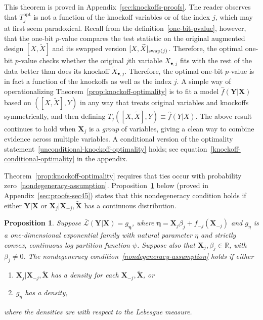 \documentclass[ejs]{imsart}
\numberwithin{equation}{section}
\theoremstyle{plain}
\newtheorem{proposition}{Proposition}
\theoremstyle{definition}
\theoremstyle{remark}
\newcommand{\prx}{\bm X}
\newcommand{\srx}{X}
\newcommand{\prxk}{{{\widetilde{\bm X}}}}
\newcommand{\srxk}{\widetilde X}
\newcommand{\pry}{{\bm Y}}
\newcommand{\sry}{Y}
\begin{document}
This theorem is proved in Appendix~\ref{sec:knockoffs-proofs}. The reader observes that $T_j^{\text{opt}}$ is not a function of the knockoff variables or of the index $j$, which may at first seem paradoxical. Recall from the definition~\eqref{one-bit-pvalue}, however, that the one-bit $p$-value compares the test statistic on the original augmented design $[\srx, \srxk]$ and its swapped version $[\srx, \srxk]_{\textnormal{swap}(j)}$. Therefore, the optimal one-bit $p$-value checks whether the original $j$th variable $\srx_{\bullet, j}$ fits with the rest of the data better than does its knockoff $\srxk_{\bullet, j}$. Therefore, the optimal one-bit $p$-value is in fact a function of the knockoffs as well as the index $j$. A simple way of operationalizing Theorem~\ref{prop:knockoff-optimality} is to fit a model $\widehat f(\pry|\prx)$ based on $([\srx, \srxk], \sry)$ in any way that treats original variables and knockoffs symmetrically, and then defining $T_j([\srx, \srxk], \sry) \equiv \widehat f(\sry|\srx)$. The above result continues to hold when $\prx_j$ is a \textit{group} of variables, giving a clean way to combine evidence across multiple variables. A conditional version of the optimality statement~\eqref{unconditional-knockoff-optimality} holds; see equation~\eqref{knockoff-conditional-optimality} in the appendix.


Theorem~\ref{prop:knockoff-optimality} requires that ties occur with probability zero~\eqref{nondegeneracy-assumption}. Proposition~\ref{prop:nondegeneracy-knockoffs} below (proved in Appendix~\ref{sec:proofs-sec45}) states that this nondegeneracy condition holds if either $\pry|\prx$ or $\prx_j|\prx_{-j}, \prxk$ has a continuous distribution.
\begin{proposition}\label{prop:nondegeneracy-knockoffs}
	Suppose $\bar{\mathcal L}(\pry|\prx) = g_{\bm\eta}$, where $\bm \eta = \prx_j \beta_j + f_{-j}(\prx_{-j})$ and $g_\eta$ is a one-dimensional exponential family with natural parameter $\eta$ and strictly convex, continuous log partition function $\psi$. Suppose also that $\prx_j, \beta_j \in \mathbb R$, with $\beta_j \neq 0$. The nondegeneracy condition~\eqref{nondegeneracy-assumption} holds if either 
	\begin{enumerate}
		\item $\prx_{j}|\prx_{-j}, \prxk$ has a density for each $\prx_{-j}, \prxk$, or
		\item $g_\eta$ has a density,
	\end{enumerate}
	where the densities are with respect to the Lebesgue measure.
\end{proposition}
\end{document}

